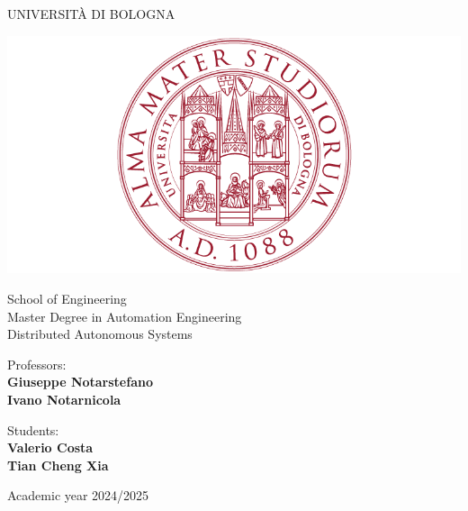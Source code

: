 \documentclass[a4paper,11pt,oneside]{book}
\begin{document}
\pagestyle{myheadings}

\thispagestyle{empty}                                                 
\begin{center}                                                            
    \vspace{5mm}
    {\LARGE UNIVERSIT\`A DI BOLOGNA} \\                       
      \vspace{5mm}
\end{center}
\begin{center}
  \includegraphics[scale=.27]{figs/logo_unibo}
\end{center}
\begin{center}
      \vspace{5mm}
      {\LARGE School of Engineering} \\
        \vspace{3mm}
      {\Large Master Degree in Automation Engineering} \\
      \vspace{20mm}
      {\LARGE Distributed Autonomous Systems} \\
      \vspace{15mm}
\end{center}
\begin{minipage}{0.48\linewidth}
      \raggedright
     {\large Professors:}\\
     \textbf{Giuseppe Notarstefano} \\
     \textbf{Ivano Notarnicola} \\        
\end{minipage}
\begin{minipage}{0.48\linewidth}
      \raggedleft
      {\large Students:}\\
      \textbf{\@ Valerio Costa} \\
      \textbf{\@ Tian Cheng Xia} \\  
\end{minipage}
\begin{center}
\vfill
      {\large Academic year \@2024/2025} \\
\end{center}
\end{document}
